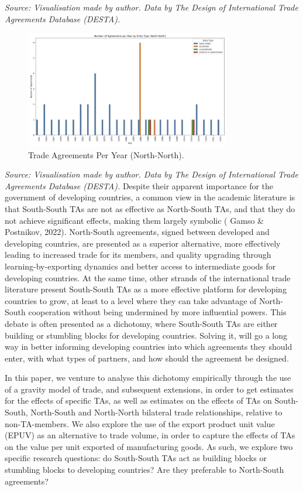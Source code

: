 \documentclass[12pt]{article}%
\begin{document}
%
\FloatBarrier%
\textit{Source: Visualisation made by author. Data by The Design of International Trade Agreements Database (DESTA).}%
\FloatBarrier%


\begin{figure}[h!]%
\centering%
\includegraphics[width=0.8\textwidth]{figures/agreements_per_year_North-North.jpg}%
\caption{Trade Agreements Per Year (North{-}North).}%
\end{figure}

%
\FloatBarrier%
\textit{Source: Visualisation made by author. Data by The Design of International Trade Agreements Database (DESTA).}%
\FloatBarrier%
Despite their apparent importance for the government of developing
countries, a common view in the academic literature is that South-South
TAs are not as effective as North-South TAs, and that they do not
achieve significant effects, making them largely symbolic (\cite{gamso_leveling-up_2022} Gamso \&
Postnikov, 2022). North-South agreements, signed between developed and
developing countries, are presented as a superior alternative, more
effectively leading to increased trade for its members, and quality
upgrading through learning-by-exporting dynamics and better access to
intermediate goods for developing countries. At the same time, other
strands of the international trade literature present South-South TAs as
a more effective platform for developing countries to grow, at least to
a level where they can take advantage of North-South cooperation without
being undermined by more influential powers. This debate is often
presented as a dichotomy, where South-South TAs are either building or
stumbling blocks for developing countries. Solving it, will go a long
way in better informing developing countries into which agreements they
should enter, with what types of partners, and how should the agreement
be designed.

In this paper, we venture to analyse this dichotomy empirically through
the use of a gravity model of trade, and subsequent extensions, in order
to get estimates for the effects of specific TAs, as well as estimates
on the effects of TAs on South-South, North-South and North-North
bilateral trade relationships, relative to non-TA-members. We also
explore the use of the export product unit value (EPUV) as an
alternative to trade volume, in order to capture the effects of TAs on
the value per unit exported of manufacturing goods. As such, we explore
two specific research questions: do South-South TAs act as building
blocks or stumbling blocks to developing countries? Are they preferable
to North-South agreements?
\end{document}
